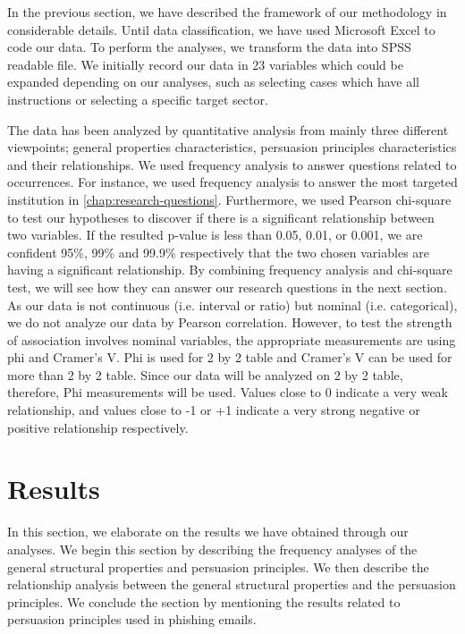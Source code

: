 In the previous section, we have described the framework of our methodology
in considerable details. Until data classification, we have used Microsoft
Excel to code our data. To perform the analyses, we transform the
data into SPSS readable file. We initially record our data in 23 variables
which could be expanded depending on our analyses, such as selecting
cases which have all instructions or selecting a specific target sector.

The data has been analyzed by quantitative analysis from mainly three
different viewpoints; general properties characteristics, persuasion
principles characteristics and their relationships. We used frequency
analysis to answer questions related to occurrences. For instance,
we used frequency analysis to answer the most targeted institution
in \autoref{chap:research-questions}. Furthermore, we used Pearson
chi-square to test our hypotheses to discover if there is a significant
relationship between two variables. If the resulted p-value is less
than 0.05, 0.01, or 0.001, we are confident 95\%, 99\% and 99.9\%
respectively that the two chosen variables are having a significant
relationship. By combining frequency analysis and chi-square test,
we will see how they can answer our research questions in the next
section. As our data is not continuous (i.e. interval or ratio) but
nominal (i.e. categorical), we do not analyze our data by Pearson
correlation. However, to test the strength of association involves
nominal variables, the appropriate measurements are using phi and
Cramer's V. Phi is used for 2 by 2 table and Cramer's V can be used
for more than 2 by 2 table. Since our data will be analyzed on 2 by
2 table, therefore, Phi measurements will be used. Values close to
0 indicate a very weak relationship, and values close to -1 or +1
indicate a very strong negative or positive relationship respectively.


\section{Results}

In this section, we elaborate on the results we have obtained through
our analyses. We begin this section by describing the frequency analyses
of the general structural properties and persuasion principles. We
then describe the relationship analysis between the general structural
properties and the persuasion principles. We conclude the section
by mentioning the results related to persuasion principles used in
phishing emails.

